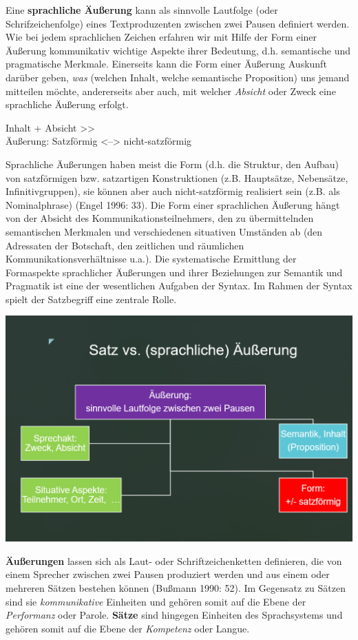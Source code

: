 \documentclass[
  letterpaper,
]{scrbook}
\begin{document}
Eine \textbf{sprachliche Äußerung} kann als sinnvolle Lautfolge (oder
Schrifzeichenfolge) eines Textproduzenten zwischen zwei Pausen definiert
werden. Wie bei jedem sprachlichen Zeichen erfahren wir mit Hilfe der
Form einer Äußerung kommunikativ wichtige Aspekte ihrer Bedeutung, d.h.
semantische und pragmatische Merkmale. Einerseits kann die Form einer
Äußerung Auskunft darüber geben, \emph{was} (welchen Inhalt, welche
semantische Proposition) uns jemand mitteilen möchte, andererseits aber
auch, mit welcher \emph{Absicht} oder Zweck eine sprachliche Äußerung
erfolgt.

Inhalt + Absicht \textgreater\textgreater{}\\
Äußerung: Satzförmig \textless--\textgreater{} nicht-satzförmig

Sprachliche Äußerungen haben meist die Form (d.h. die Struktur, den
Aufbau) von satzförmigen bzw. satzartigen Konstruktionen (z.B.
Hauptsätze, Nebensätze, Infinitivgruppen), sie können aber auch
nicht-satzförmig realisiert sein (z.B. als Nominalphrase) (Engel 1996:
33). Die Form einer sprachlichen Äußerung hängt von der Absicht des
Kommunikationsteilnehmers, den zu übermittelnden semantischen Merkmalen
und verschiedenen situativen Umständen ab (den Adressaten der Botschaft,
den zeitlichen und räumlichen Kommunikationsverhältnisse u.a.). Die
systematische Ermittlung der Formaspekte sprachlicher Äußerungen und
ihrer Beziehungen zur Semantik und Pragmatik ist eine der wesentlichen
Aufgaben der Syntax. Im Rahmen der Syntax spielt der Satzbegriff eine
zentrale Rolle.

\includegraphics[width=1\textwidth,height=\textheight]{./pictures/aeusserung_vs_satz.png}

\textbf{Äußerungen} lassen sich als Laut- oder Schriftzeichenketten
definieren, die von einem Sprecher zwischen zwei Pausen produziert
werden und aus einem oder mehreren Sätzen bestehen können (Bußmann 1990:
52). Im Gegensatz zu Sätzen sind sie \emph{kommunikative} Einheiten und
gehören somit auf die Ebene der \emph{Performanz} oder Parole.
\textbf{Sätze} sind hingegen Einheiten des Sprachsystems und gehören
somit auf die Ebene der \emph{Kompetenz} oder Langue.
\end{document}
